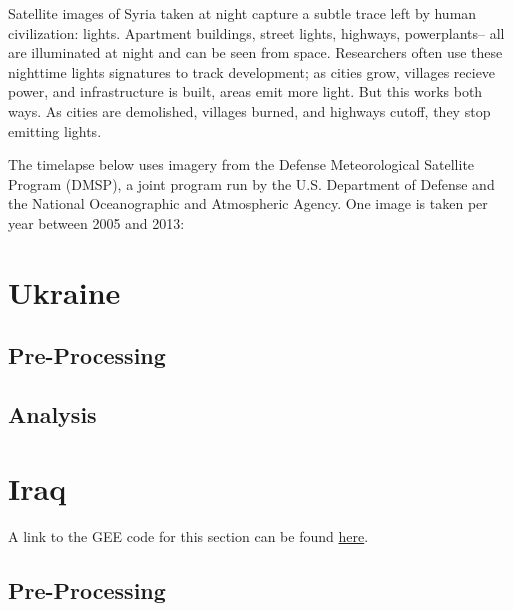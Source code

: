 \documentclass[
  letterpaper,
  DIV=11,
  numbers=noendperiod]{scrreprt}
\begin{document}

Satellite images of Syria taken at night capture a subtle trace left by
human civilization: lights. Apartment buildings, street lights,
highways, powerplants-- all are illuminated at night and can be seen
from space. Researchers often use these nighttime lights signatures to
track development; as cities grow, villages recieve power, and
infrastructure is built, areas emit more light. But this works both
ways. As cities are demolished, villages burned, and highways cutoff,
they stop emitting lights.

The timelapse below uses imagery from the Defense Meteorological
Satellite Program (DMSP), a joint program run by the U.S. Department of
Defense and the National Oceanographic and Atmospheric Agency. One image
is taken per year between 2005 and 2013:

\hypertarget{ukraine}{%
\section*{Ukraine}\label{ukraine}}


\hypertarget{pre-processing}{%
\subsection*{Pre-Processing}\label{pre-processing}}

\hypertarget{analysis}{%
\subsection*{Analysis}\label{analysis}}

\hypertarget{iraq}{%
\section*{Iraq}\label{iraq}}


A link to the GEE code for this section can be found
\href{https://code.earthengine.google.com/2cf77d8cb9afd76b73100637fbffdf5d}{here}.

\hypertarget{pre-processing-1}{%
\subsection*{Pre-Processing}\label{pre-processing-1}}
\end{document}
